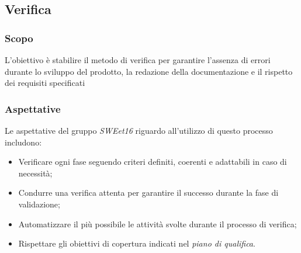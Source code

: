 \pagebreak
\subsection{Verifica}
\subsubsection{Scopo}
L'obiettivo è stabilire il metodo di verifica per garantire l'assenza
di errori durante lo sviluppo del prodotto, la redazione della documentazione
e il rispetto dei requisiti specificati
\subsubsection{Aspettative}
Le aspettative del gruppo \emph{SWEet16} riguardo all'utilizzo di questo processo includono:
\begin{itemize}
    \item Verificare ogni fase seguendo criteri definiti, coerenti e adattabili in caso di necessità;
    \item Condurre una verifica attenta per garantire il successo durante la fase di validazione;
    \item Automatizzare il più possibile le attività svolte durante il processo di verifica;
    \item Rispettare gli obiettivi di copertura indicati nel \emph{piano di qualifica}.
\end{itemize}
